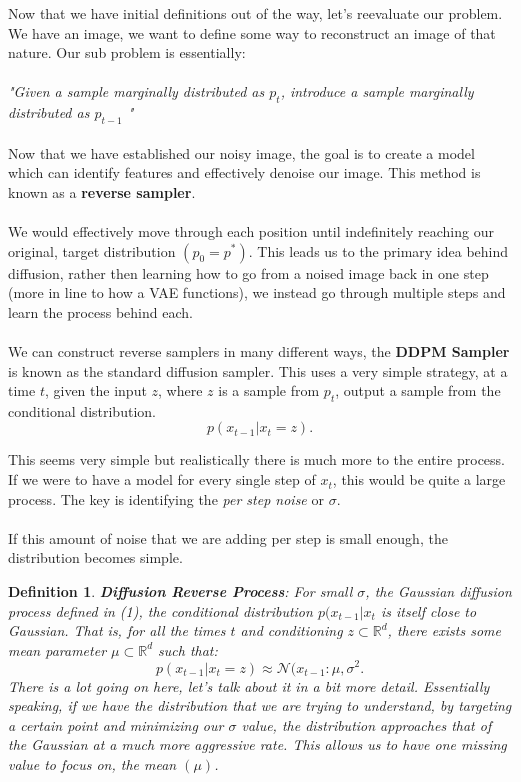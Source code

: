 \documentclass[10pt, oneside]{report}
\newcommand{\R}{\mathbb{R}}
\newtheorem{defn}{Definition}
\begin{document}
Now that we have initial definitions out of the way, let's reevaluate our problem.  We have an image, we want to define some way to reconstruct an image of that nature.  Our sub problem is essentially:
\\
\\

\textit{"Given a sample marginally distributed as $p_t$, introduce a sample marginally distributed as $p_{t-1}$ "}
\\
\\

Now that we have established our noisy image, the goal is to create a model which can identify features and effectively denoise our image.  This method is known as a \textbf{reverse sampler}.
\\
\\

We would effectively move through each position until indefinitely reaching our original, target distribution $(p_0 = p^*)$.  This leads us to the primary idea behind diffusion, rather then learning how to go from a noised image back in one step (more in line to how a VAE functions), we instead go through multiple steps and learn the process behind each.
\\
\\

We can construct reverse samplers in many different ways, the \textbf{DDPM Sampler} is known as the standard diffusion sampler.  This uses a very simple strategy, at a time $t$, given the input $z$, where $z$ is a sample from $p_t$, output a sample from the conditional distribution.
\[
    p(x_{t-1}|x_t = z)
.\] 

This seems very simple but realistically there is much more to the entire process.  If we were to have a model for every single step of $x_t$, this would be quite a large process.  The key is identifying the \textit{per step noise} or  $\sigma$.
\\
\\

If this amount of noise that we are adding per step is small enough, the distribution becomes simple.  

\begin{defn}
    \textbf{Diffusion Reverse Process}: For small $\sigma$, the Gaussian diffusion process defined in (1), the conditional distribution $p(x_{t-1}|x_t$ is itself close to Gaussian.  That is, for all the times $t$ and conditioning $z \subset \R^d$, there exists some mean parameter $\mu \subset \R^d$ such that:
 \[
p(x_{t-1}|x_t = z) \approx \mathcal{N}(x_{t-1} : \mu, \sigma^2
.\] 
There is a lot going on here, let's talk about it in a bit more detail.  Essentially speaking, if we have the distribution that we are trying to understand, by targeting a certain point and minimizing our $\sigma$ value, the distribution approaches that of the Gaussian at a much more aggressive rate.  This allows us to have one missing value to focus on, the mean $(\mu)$.

\end{defn}
\end{document}
